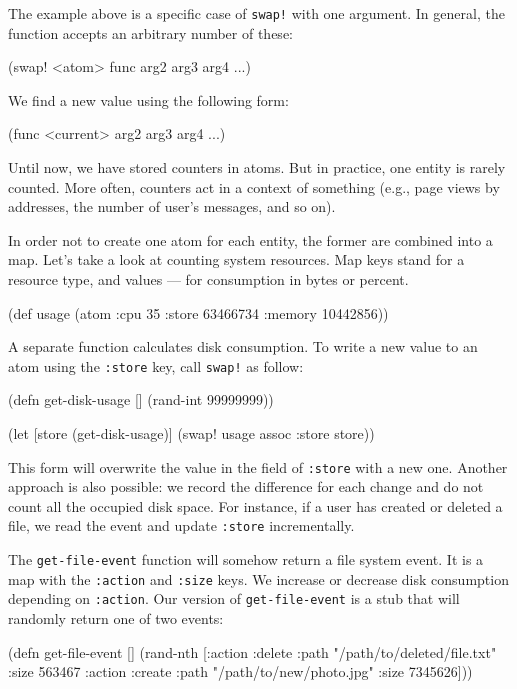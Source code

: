 The example above is a specific case of \verb|swap!| with one argument. In general, the function accepts an arbitrary number of these:

\begin{clojure}
(swap! <atom> func arg2 arg3 arg4 ...)
\end{clojure}

\noindent
We find a new value using the following form:

\begin{clojure}
(func <current> arg2 arg3 arg4 ...)
\end{clojure}

Until now, we have stored counters in atoms.
But in practice, one entity is rarely counted.
More often, counters act in a context of something (e.g., page views by addresses, the number of user's messages, and so on).

In order not to create one atom for each entity, the former are combined into a map.
Let’s take a look at counting system resources.
Map keys stand for a resource type, and values — for consumption in bytes or percent.

\begin{clojure}
(def usage
  (atom {:cpu 35
         :store 63466734
         :memory 10442856}))
\end{clojure}

A separate function calculates disk consumption.
To write a new value to an atom using the \verb|:store| key, call \verb|swap!| as follow:

\begin{clojure}
(defn get-disk-usage []
  (rand-int 99999999))

(let [store (get-disk-usage)]
  (swap! usage assoc :store store))
\end{clojure}

This form will overwrite the value in the field of \verb|:store| with a new one. Another approach is also possible: we record the difference for each change and do not count all the occupied disk space.
For instance, if a user has created or deleted a file, we read the event and update \verb|:store| incrementally.

The \verb|get-file-event| function will somehow return a file system event.
It is a map with the \verb|:action| and \verb|:size| keys.
We increase or decrease disk consumption depending on \verb|:action|.
Our version of \texttt{get-file\--event} is a stub that will randomly return one of two events:

\begin{clojure}
(defn get-file-event []
  (rand-nth
   [{:action :delete
     :path "/path/to/deleted/file.txt"
     :size 563467}
    {:action :create
     :path "/path/to/new/photo.jpg"
     :size 7345626}]))
\end{clojure}

